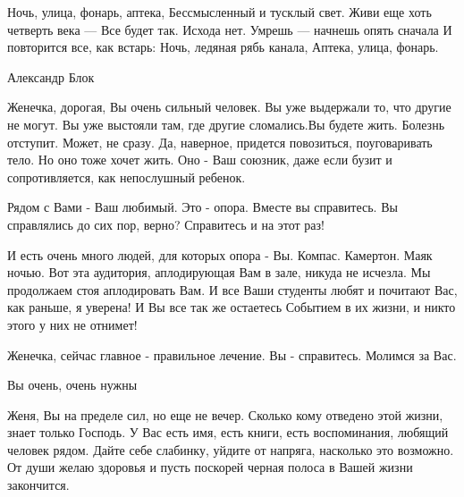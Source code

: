 \begin{itemize}
\obeycr
Ночь, улица, фонарь, аптека,
Бессмысленный и тусклый свет.
Живи еще хоть четверть века —
Все будет так. Исхода нет.
Умрешь — начнешь опять сначала
И повторится все, как встарь:
Ночь, ледяная рябь канала,
Аптека, улица, фонарь.
\restorecr

Александр Блок


 

Женечка, дорогая, Вы очень сильный человек. Вы уже выдержали то, что другие не
могут. Вы уже выстояли там, где другие сломались.Вы будете жить. Болезнь
отступит. Может, не сразу. Да, наверное, придется повозиться, поуговаривать
тело. Но оно тоже хочет жить. Оно - Ваш союзник, даже если бузит и
сопротивляется, как непослушный ребенок.

Рядом с Вами - Ваш любимый. Это - опора. Вместе вы справитесь. Вы справлялись
до сих пор, верно? Справитесь и на этот раз!

И есть очень много людей, для которых опора - Вы. Компас. Камертон. Маяк ночью.
Вот эта аудитория, аплодирующая Вам в зале, никуда не исчезла. Мы продолжаем
стоя аплодировать Вам. И все Ваши студенты любят и почитают Вас, как раньше, я
уверена! И Вы все так же остаетесь Событием в их жизни, и никто этого у них не
отнимет!

Женечка, сейчас главное - правильное лечение. Вы - справитесь. Молимся за Вас.

Вы очень, очень нужны🙏

 

Женя, Вы на пределе сил, но еще не вечер. Сколько кому отведено этой жизни,
знает только Господь. У Вас есть имя, есть книги, есть воспоминания, любящий
человек рядом. Дайте себе слабинку, уйдите от напряга, насколько это возможно.
От души желаю здоровья и пусть поскорей черная полоса в Вашей жизни закончится.


 


\end{itemize}
